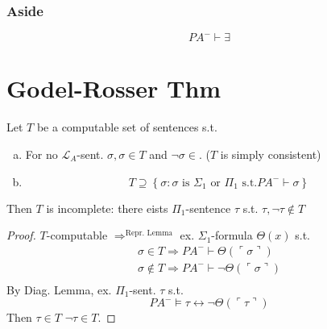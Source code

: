 \documentclass[12pt]{article}
\newcommand{\proves}{\vdash}
\newcommand{\gn}[1]{\ulcorner #1 \urcorner}
\begin{document}
\subsubsection*{Aside}
\[
PA^- \proves \exists
\]

\section*{Godel-Rosser Thm}
Let $T$ be a computable set of sentences s.t.
\begin{enumerate}[(a)]
  \item For no $\mathcal{L}_A$-sent. $\sigma, \sigma \in T$ and $\neg\sigma \in $. ($T$ is simply consistent)
  \item 
    \[
T \supseteq \left\{ \sigma : \sigma \text{ is $\Sigma_1$ or $\Pi_1$ s.t.} PA^- \proves \sigma  \right\}
    \]
\end{enumerate}
Then $T$ is incomplete: there eists $\Pi_1$-sentence $\tau$ s.t.
$\tau, \neg \tau \not\in T$

\begin{proof}
  $T$-computable  $\Rightarrow^\text{Repr. Lemma}$ ex. $\Sigma_1$-formula
  $\Theta(x)$ s.t.
\begin{align*}
  \sigma \in T \Rightarrow PA^- \proves \Theta(\gn{\sigma}) \\
  \sigma \not\in T \Rightarrow PA^- \proves \neg \Theta(\gn{\sigma}) \\
\end{align*}
By Diag. Lemma, ex. $\Pi_1$-sent. $\tau$ s.t.
\[
PA^- \models \tau \leftrightarrow \neg \Theta( \gn{\tau})
\]
Then $\tau \in T$
$\neg \tau \in T$.
\end{proof}
\end{document}
